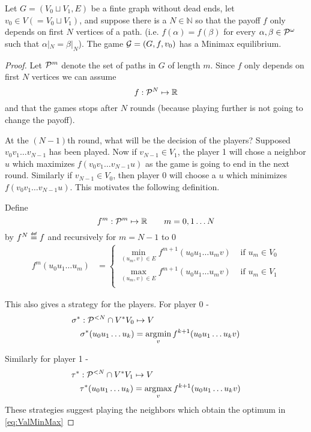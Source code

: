 \begin{theorem}
    \label{thm:finiteMinMax}
    Let $G=(V_0 \sqcup V_1,E)$ be a finte graph without dead ends, let $v_0 \in V(=V_0 \sqcup V_1)$, and suppose there is a $N \in \mathbb{N}$ so that the payoff $f$ only depends on first $N$ vertices of a path. (i.e. $f(\alpha) = f(\beta)$ for every $\alpha,\beta \in \PI$ such that $\alpha|_N = \beta|_N$). The game $\G=(G,f,v_0)$ has a Minimax equilibrium.
\end{theorem}
\begin{proof}
    Let $\PF[m]$ denote the set of paths in $G$ of length $m$. Since $f$ only depends on first $N$ vertices we can assume
    \[
        f : \PF[N] \mapsto \Reals
    \]
    and that the games stops after $N$ rounds (because playing further is not going to change the payoff).

    At the $(N-1)$th round, what will be the decision of the players? Supposed $v_0v_1\ldots v_{N-1}$ has been played. Now if $v_{N-1} \in V_1$, the player 1 will chose a neighbor $u$ which maximizes $f(v_0v_1\ldots v_{N-1}u)$ as the game is going to end in the next round. Similarly if $v_{N-1} \in V_0$, then player 0 will choose a $u$ which minimizes $f(v_0v_1\ldots v_{N-1}u)$. This motivates the following definition.

Define 
\[
    f^m : \PF[m] \mapsto \Reals \qquad m=0,1\ldots N
\]
by $f^N \defeq f$ and recursively for $m=N-1$ to $0$
\begin{align}
    f^m (u_0u_1\ldots u_m) &= 
    \begin{cases}
        \min_{(u_m,v) \in E} f^{m+1}(u_0u_1\ldots u_m v) & \text{ if } u_m \in V_0\\
        \max_{(u_m,v) \in E} f^{m+1}(u_0u_1\ldots u_m v) & \text{ if } u_m \in V_1\\
    \end{cases} \label{eq:ValMinMax}
\end{align}

This also gives a strategy for the players. For player 0 -
\begin{align}
    \sigma^* : \PF[<N] \cap V^{*}V_0 &\mapsto V\\
    \sigma^*(u_0u_1\ldots u_k) &= \argmin_{v} f^{k+1}(u_0u_1\ldots u_k v)
\end{align}

Similarly for player 1 -
\begin{align}
    \tau^* : \PF[<N] \cap V^{*}V_1 &\mapsto V\\
    \tau^*(u_0u_1\ldots u_k) &= \argmax_{v} f^{k+1}(u_0u_1\ldots u_k v)
\end{align}
These strategies suggest playing the neighbors which obtain the optimum in \eqref{eq:ValMinMax}


\end{proof}
